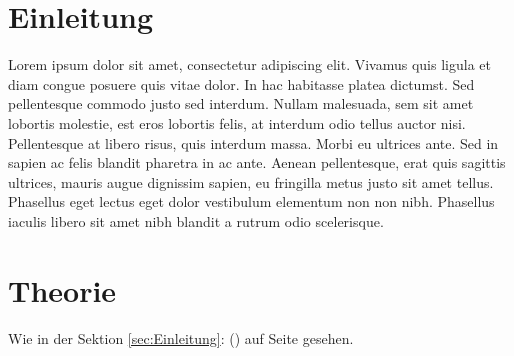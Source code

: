 \documentclass[10pt]{article}
\begin{document}
\section{Einleitung \label{sec:Einleitung}}

Lorem ipsum dolor sit amet, consectetur adipiscing elit. Vivamus quis ligula et diam congue posuere quis vitae dolor. In hac habitasse platea dictumst. Sed pellentesque commodo justo sed interdum. Nullam malesuada, sem sit amet lobortis molestie, est eros lobortis felis, at interdum odio tellus auctor nisi. Pellentesque at libero risus, quis interdum massa. Morbi eu ultrices ante. Sed in sapien ac felis blandit pharetra in ac ante. Aenean pellentesque, erat quis sagittis ultrices, mauris augue dignissim sapien, eu fringilla metus justo sit amet tellus. Phasellus eget lectus eget dolor vestibulum elementum non non nibh. Phasellus iaculis libero sit amet nibh blandit a rutrum odio scelerisque.

\newpage

\section{Theorie \label{sec:Theorie}}
Wie in der Sektion \ref{sec:Einleitung}: () auf Seite \pageref{sec:Einleitung} gesehen.
\end{document}
